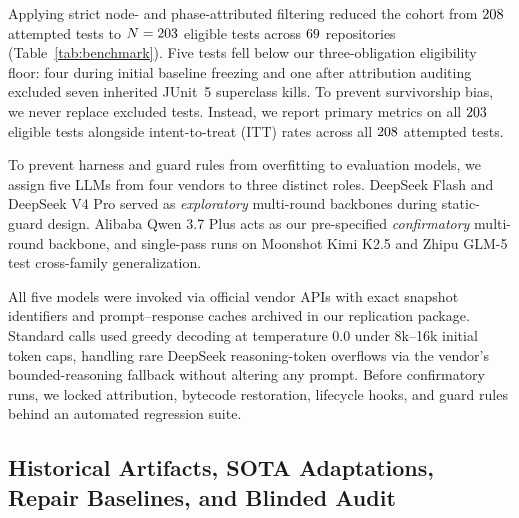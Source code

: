 Applying strict node- and phase-attributed filtering reduced the cohort from $208$ attempted tests to $N = 203$ eligible tests across $69$ repositories (Table~\ref{tab:benchmark}). Five tests fell below our three-obligation eligibility floor: four during initial baseline freezing and one after attribution auditing excluded seven inherited JUnit~5 superclass kills. To prevent survivorship bias, we never replace excluded tests. Instead, we report primary metrics on all $203$ eligible tests alongside intent-to-treat (ITT) rates across all $208$ attempted tests.



To prevent harness and guard rules from overfitting to evaluation models, we assign five LLMs from four vendors to three distinct roles. DeepSeek Flash and DeepSeek V4 Pro served as \emph{exploratory} multi-round backbones during static-guard design. Alibaba Qwen 3.7 Plus acts as our pre-specified \emph{confirmatory} multi-round backbone, and single-pass runs on Moonshot Kimi K2.5 and Zhipu GLM-5 test cross-family generalization.

All five models were invoked via official vendor APIs with exact snapshot identifiers and prompt--response caches archived in our replication package. Standard calls used greedy decoding at temperature 0.0 under 8k--16k initial token caps, handling rare DeepSeek reasoning-token overflows via the vendor's bounded-reasoning fallback without altering any prompt. Before confirmatory runs, we locked attribution, bytecode restoration, lifecycle hooks, and guard rules behind an automated regression suite.

\subsection{Historical Artifacts, SOTA Adaptations, Repair Baselines, and Blinded Audit}


